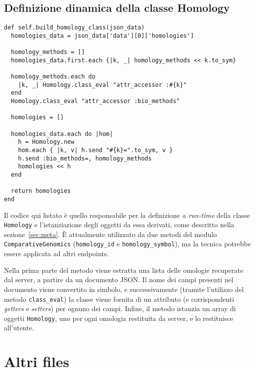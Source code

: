 \subsection*{Definizione dinamica della classe Homology}

\begin{verbatim}
def self.build_homology_class(json_data)
  homologies_data = json_data['data'][0]['homologies']

  homology_methods = []
  homologies_data.first.each {|k, _| homology_methods << k.to_sym}
  
  homology_methods.each do
    |k, _| Homology.class_eval "attr_accessor :#{k}"
  end
  Homology.class_eval "attr_accessor :bio_methods"

  homologies = []

  homologies_data.each do |hom| 
    h = Homology.new
    hom.each { |k, v| h.send "#{k}=".to_sym, v }
    h.send :bio_methods=, homology_methods 
    homologies << h 
  end

  return homologies
end
\end{verbatim}

Il codice qui listato è quello responsabile per la definizione \emph{a run-time} della classe \texttt{Homology} e l'istanziazione degli oggetti da essa derivati, come descritto nella sezione~\ref{sec:meta}. È attualmente utilizzato da due metodi del modulo \texttt{ComparativeGenomics} (\texttt{homology\_id} e \texttt{homology\_symbol}), ma la tecnica potrebbe essere applicata ad altri endpoints.

Nella prima parte del metodo viene estratta una lista delle omologie recuperate dal server, a partire da un documento JSON. Il nome dei campi presenti nel documento viene convertito in simbolo, e successivamente (tramite l'utilizzo del metodo \texttt{class\_eval}) la classe viene fornita di un attributo (e corrispondenti \emph{getters} e \emph{setters}) per ognuno dei campi. Infine, il metodo istanzia un array di oggetti \texttt{Homology}, uno per ogni omologia restituita da server, e lo restituisce all'utente.


\section*{Altri files}
\label{app:files}

